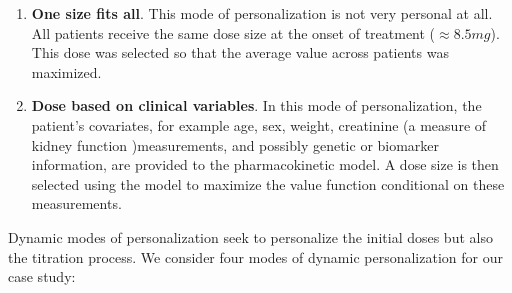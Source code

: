 \begin{enumerate}
	\item \textbf{One size fits all}.  This mode of personalization is not very personal at all.  All patients receive the same dose size at the onset of treatment ($\approx8.5 mg$). This dose was selected so that the average value across patients was maximized.  
	\item \textbf{Dose based on clinical variables}.  In this mode of personalization, the patient's covariates, for example age, sex, weight, creatinine (a measure of kidney function )measurements, and possibly genetic or biomarker information, are provided to the pharmacokinetic model.  A dose size is then selected using the model to maximize the value function conditional on these measurements.
\end{enumerate}

\noindent Dynamic modes of personalization seek to personalize the initial doses but also the titration process.  We consider four modes of dynamic personalization for our case study:

